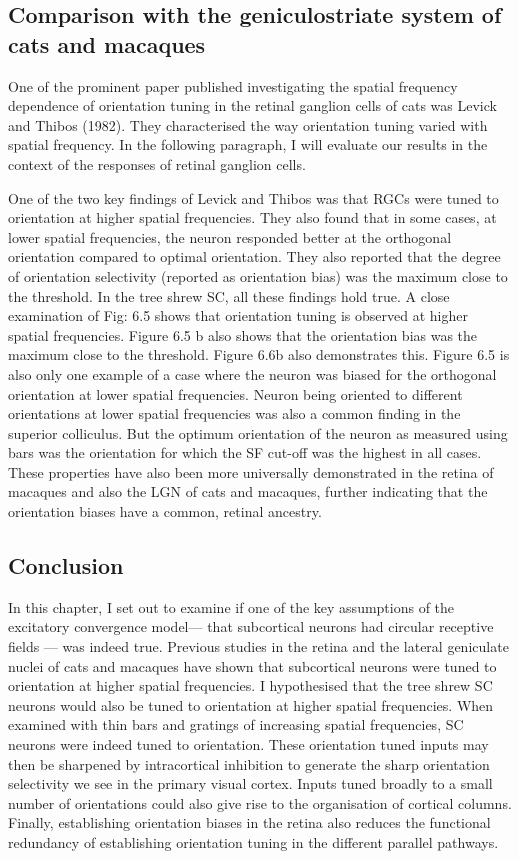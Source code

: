 \documentclass [12pt]{report}
\begin{document}
	\subsection {Comparison with the geniculostriate system of cats and macaques}
	One of the prominent paper published investigating the spatial frequency dependence of orientation tuning in the retinal ganglion cells of cats was Levick and Thibos (1982). They characterised the way orientation tuning varied with spatial frequency. In the following paragraph, I will evaluate our results in the context of the responses of retinal ganglion cells.
	
	One of the two key findings of Levick and Thibos was that RGCs were tuned to orientation at higher spatial frequencies. They also found that in some cases, at lower spatial frequencies, the neuron responded better at the orthogonal orientation compared to optimal orientation. They also reported that the degree of orientation selectivity (reported as orientation bias) was the maximum close to the threshold. In the tree shrew SC, all these findings hold true. A close examination of Fig: 6.5 shows that orientation tuning is observed at higher spatial frequencies. Figure 6.5 b also shows that the orientation bias was the maximum close to the threshold. Figure 6.6b also demonstrates this. Figure 6.5 is also only one example of a case where the neuron was biased for the orthogonal orientation at lower spatial frequencies. Neuron being oriented to different orientations at lower spatial frequencies was also a common finding in the superior colliculus. But the optimum orientation of the neuron as measured using bars was the orientation for which the SF cut-off was the highest in all cases. These properties have also been more universally demonstrated in the retina of macaques and also the LGN of cats and macaques, further indicating that the orientation biases have a common, retinal ancestry.
	
	\subsection{Conclusion}
	
	In this chapter, I set out to examine if one of the key assumptions of the excitatory convergence model— that subcortical neurons had circular receptive fields — was indeed true. Previous studies in the retina and the lateral geniculate nuclei of cats and macaques have shown that subcortical neurons were tuned to orientation at higher spatial frequencies. I hypothesised that the tree shrew SC neurons would also be tuned to orientation at higher spatial frequencies. When examined with thin bars and gratings of increasing spatial frequencies, SC neurons were indeed tuned to orientation. These orientation tuned inputs may then be sharpened by intracortical inhibition to generate the sharp orientation selectivity we see in the primary visual cortex. Inputs tuned broadly to a small number of orientations could also give rise to the organisation of cortical columns. Finally, establishing orientation biases in the retina also reduces the functional redundancy of establishing orientation tuning in the different parallel pathways.
	
	
\end{document}
